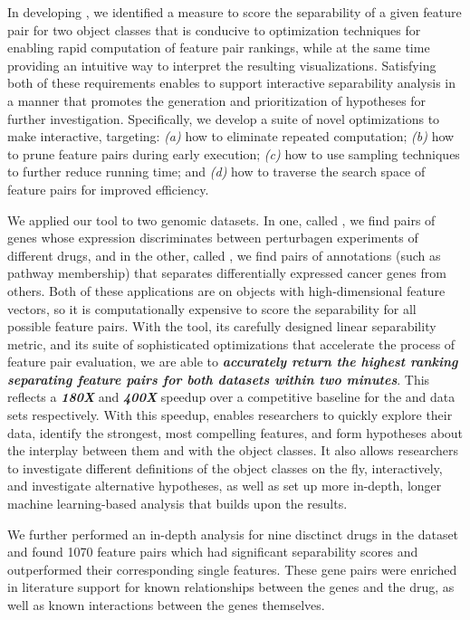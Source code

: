 In developing \genviz,
we identified a measure to score the separability
of a given feature pair for two object classes
that is conducive to
optimization techniques for enabling rapid
computation of feature pair rankings, while at
the same time providing an intuitive way to interpret
the resulting visualizations.
Satisfying both of these requirements 
enables \genviz to support interactive separability analysis 
in a manner that promotes the generation and prioritization 
of hypotheses for further investigation. 
Specifically, we develop a suite of novel 
optimizations to make \genviz interactive, 
targeting: {\em (a)} how to eliminate repeated computation; 
{\em (b)} how to prune feature pairs during early execution; 
{\em (c)} how to use sampling techniques to further reduce running time; 
and {\em (d)} how to traverse the search space 
of feature pairs for improved efficiency.

We applied our \genviz tool to two genomic datasets.
In one, called \lincs, we find pairs of genes
whose expression discriminates between perturbagen experiments
of different drugs, and in the other, called \msig,
we find pairs of annotations (such as pathway membership)
that separates differentially expressed 
cancer genes from others.
Both of these applications are on 
objects with high-dimensional feature vectors,
so it is computationally expensive to score the separability
for all possible feature pairs.
With the \genviz tool, its carefully designed 
linear separability metric,
and its suite of sophisticated optimizations 
that accelerate the process of feature pair evaluation,
we are able to {\bf \em accurately return the 
highest ranking separating
feature pairs for both datasets  within two minutes}.
This reflects a {\bf \em 180X} and {\bf \em 400X} speedup
over a competitive baseline for the \msig and \lincs data sets respectively.
With this speedup, \genviz enables researchers to quickly explore their data,
identify the strongest, most compelling features,
and form hypotheses about the interplay between them and with the object classes.
It also allows researchers to investigate different definitions
of the object classes on the fly, interactively,
and investigate alternative hypotheses,
as well as set up more in-depth,
longer machine learning-based analysis 
that builds upon the \genviz results.

We further performed an in-depth analysis
for nine disctinct drugs in the \lincs dataset and
found 1070 feature pairs which had significant separability scores and outperformed
their corresponding single features.  These gene pairs were enriched
in literature support for known relationships between the genes and the drug,
as well as known interactions between the genes themselves.

